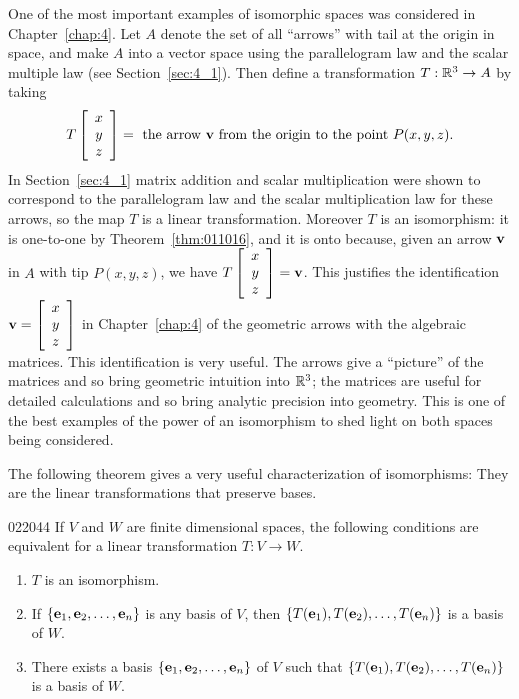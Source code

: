 One of the most important examples of isomorphic spaces was considered in Chapter~\ref{chap:4}. Let $A$ denote the set of all ``arrows'' with tail at the origin in space, and make $A$ into a vector space using the parallelogram law and the scalar multiple law (see Section~\ref{sec:4_1}). Then define a transformation $T : \mathbb{R}^3 \to A$ by taking
\begin{equation*}
T\left[ \begin{array}{c}
x \\
y \\
z
\end{array} \right] = \mbox{ the arrow } \textbf{v} \mbox{ from the origin to the point } P(x, y, z).
\end{equation*}
In Section~\ref{sec:4_1} matrix addition and scalar multiplication were shown to correspond to the parallelogram law and the scalar multiplication law for these arrows, so the map $T$ is a linear transformation. Moreover $T$ is an isomorphism: it is one-to-one by Theorem~\ref{thm:011016}, and it is onto because, given an arrow $\textbf{v}$ in $A$ with tip $P(x, y, z)$, we have $T\left[ \begin{array}{c}
x \\
y \\
z
\end{array} \right] = \textbf{v}$.
 This justifies the identification $\textbf{v} = \left[ \begin{array}{c}
 x \\
 y \\
 z
 \end{array} \right]$ 
in Chapter~\ref{chap:4} of the geometric arrows with the algebraic matrices. This identification is very useful. The arrows give a ``picture'' of the matrices and so bring geometric intuition into $\mathbb{R}^3$; the matrices are useful for detailed calculations and so bring analytic precision into geometry. This is one of the best examples of the power of an isomorphism to shed light on both spaces being considered.


The following theorem gives a very useful characterization of isomorphisms: They are the linear transformations that preserve bases.


\begin{theorem}{}{022044}
If $V$ and $W$ are finite dimensional spaces, the following conditions are equivalent for a linear transformation $T : V \to W$.


\begin{enumerate}
\item $T$ is an isomorphism.

\item If $\{\textbf{e}_{1}, \textbf{e}_{2}, \dots, \textbf{e}_{n}\}$ is any basis of $V$, then $\{T(\textbf{e}_{1}), T(\textbf{e}_{2}), \dots, T(\textbf{e}_{n})\}$ is a basis of $W$.

\item There exists a basis $\{\textbf{e}_{1}, \textbf{e}_{2}, \dots, \textbf{e}_{n}\}$ of $V$ such that $\{T(\textbf{e}_{1}), T(\textbf{e}_{2}), \dots, T(\textbf{e}_{n})\}$ is a basis of $W$.

\end{enumerate}
\end{theorem}

